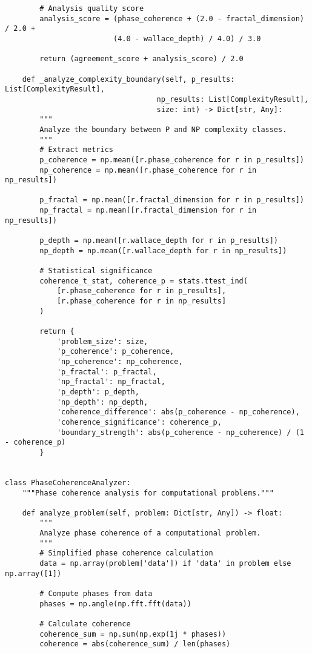 \documentclass[12pt]{article}
\begin{document}
\begin{lstlisting}
        # Analysis quality score
        analysis_score = (phase_coherence + (2.0 - fractal_dimension) / 2.0 +
                         (4.0 - wallace_depth) / 4.0) / 3.0

        return (agreement_score + analysis_score) / 2.0

    def _analyze_complexity_boundary(self, p_results: List[ComplexityResult],
                                   np_results: List[ComplexityResult],
                                   size: int) -> Dict[str, Any]:
        """
        Analyze the boundary between P and NP complexity classes.
        """
        # Extract metrics
        p_coherence = np.mean([r.phase_coherence for r in p_results])
        np_coherence = np.mean([r.phase_coherence for r in np_results])

        p_fractal = np.mean([r.fractal_dimension for r in p_results])
        np_fractal = np.mean([r.fractal_dimension for r in np_results])

        p_depth = np.mean([r.wallace_depth for r in p_results])
        np_depth = np.mean([r.wallace_depth for r in np_results])

        # Statistical significance
        coherence_t_stat, coherence_p = stats.ttest_ind(
            [r.phase_coherence for r in p_results],
            [r.phase_coherence for r in np_results]
        )

        return {
            'problem_size': size,
            'p_coherence': p_coherence,
            'np_coherence': np_coherence,
            'p_fractal': p_fractal,
            'np_fractal': np_fractal,
            'p_depth': p_depth,
            'np_depth': np_depth,
            'coherence_difference': abs(p_coherence - np_coherence),
            'coherence_significance': coherence_p,
            'boundary_strength': abs(p_coherence - np_coherence) / (1 - coherence_p)
        }


class PhaseCoherenceAnalyzer:
    """Phase coherence analysis for computational problems."""

    def analyze_problem(self, problem: Dict[str, Any]) -> float:
        """
        Analyze phase coherence of a computational problem.
        """
        # Simplified phase coherence calculation
        data = np.array(problem['data']) if 'data' in problem else np.array([1])

        # Compute phases from data
        phases = np.angle(np.fft.fft(data))

        # Calculate coherence
        coherence_sum = np.sum(np.exp(1j * phases))
        coherence = abs(coherence_sum) / len(phases)


\end{lstlisting}
\end{document}

